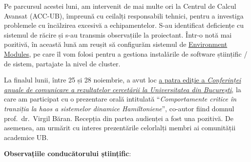 Pe parcursul acestei luni, am intervenit de mai multe ori la Centrul de Calcul Avansat (ACC-UB), împreună cu ceilalți responsabili tehnici, pentru a investiga problemele cu încălzirea excesivă a echipamentelor. S-au identificat deficiențe cu sistemul de răcire și s-au transmis observațiile la proiectant. Într-o notă mai pozitivă, în această lună am reușit să configurăm sistemul de \href{https://envmodules.io/}{Environment Modules}, pe care îl vom folosi pentru a gestiona instalările de software științific / de sistem, partajate la nivel de cluster. 

La finalul lunii, între 25 și 28 noiembrie, a avut loc \href{https://unibuc.ro/conferinta-anuala-de-comunicare-a-rezultatelor-cercetarii-la-universitatea-din-bucuresti-ajunge-la-a-patra-editie-si-propune-un-format-optimizat-mai-dinamic-si-inovator-2/}{a patra ediție a \emph{Conferinței anuale de comunicare a rezultatelor cercetării la Universitatea din București}}, la care am participat cu o prezentare orală intitulată ``\textit{Comportamente critice în tranziția la haos a sistemelor dinamice Hamiltoniene}'', co-autor fiind domnul prof.~dr.~Virgil Băran. Recepția din partea audienței a fost una pozitivă. De asemenea, am urmărit cu interes prezentările celorlalți membri ai comunității academice UB.


\textbf{Observațiile conducătorului științific}:

